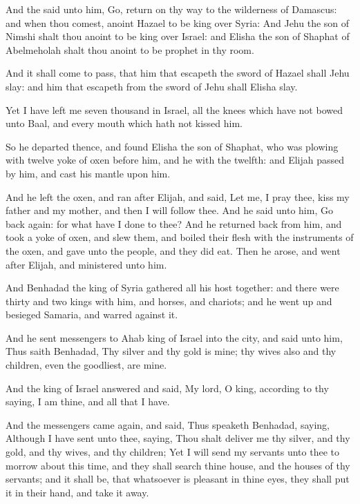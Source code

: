\Verse And the \LORD said unto him, Go, return on thy way to the wilderness of Damascus: and when thou comest, anoint Hazael to be king over Syria: \Verse And Jehu the son of Nimshi shalt thou anoint to be king over Israel: and Elisha the son of Shaphat of Abelmeholah shalt thou anoint to be prophet in thy room.

\Verse And it shall come to pass, that him that escapeth the sword of Hazael shall Jehu slay: and him that escapeth from the sword of Jehu shall Elisha slay.

\Verse Yet I have left me seven thousand in Israel, all the knees which have not bowed unto Baal, and every mouth which hath not kissed him.

\Verse So he departed thence, and found Elisha the son of Shaphat, who was plowing with twelve yoke of oxen before him, and he with the twelfth: and Elijah passed by him, and cast his mantle upon him.

\Verse And he left the oxen, and ran after Elijah, and said, Let me, I pray thee, kiss my father and my mother, and then I will follow thee.  And he said unto him, Go back again: for what have I done to thee?  \Verse And he returned back from him, and took a yoke of oxen, and slew them, and boiled their flesh with the instruments of the oxen, and gave unto the people, and they did eat. Then he arose, and went after Elijah, and ministered unto him.


\Chapter
\Verse And Benhadad the king of Syria gathered all his host together: and there were thirty and two kings with him, and horses, and chariots; and he went up and besieged Samaria, and warred against it.

\Verse And he sent messengers to Ahab king of Israel into the city, and said unto him, Thus saith Benhadad, \Verse Thy silver and thy gold is mine; thy wives also and thy children, even the goodliest, are mine.

\Verse And the king of Israel answered and said, My lord, O king, according to thy saying, I am thine, and all that I have.

\Verse And the messengers came again, and said, Thus speaketh Benhadad, saying, Although I have sent unto thee, saying, Thou shalt deliver me thy silver, and thy gold, and thy wives, and thy children; \Verse Yet I will send my servants unto thee to morrow about this time, and they shall search thine house, and the houses of thy servants; and it shall be, that whatsoever is pleasant in thine eyes, they shall put it in their hand, and take it away.

